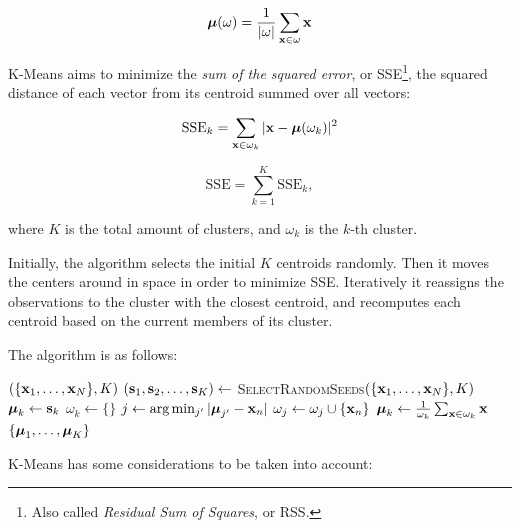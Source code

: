 $$\boldsymbol{\mathbf{\mu}}(\omega) = \frac{1}{|\omega|} \sum_{\boldsymbol{\mathbf{x}} \in \omega} \boldsymbol{\mathbf{x}}$$

K-Means aims to minimize the {\em sum of the squared error}, or
SSE\footnote{Also called {\em Residual Sum of Squares}, or RSS.}, the squared
distance of each vector from its centroid summed over all vectors:

$$ \text{SSE}_k = \sum_{\boldsymbol{\mathbf{x}} \in \omega_k} |\boldsymbol{\mathbf{x}} - \boldsymbol{\mathbf{\mu}}(\omega_k)|^2 $$

$$ \text{SSE} = \sum_{k = 1}^K \text{SSE}_k, $$

where $K$ is the total amount of clusters, and $\omega_k$ is the $k$-th cluster.

Initially, the algorithm selects the initial $K$ centroids randomly.
%
Then it moves the centers around in space in order to minimize SSE.
%
Iteratively it reassigns the observations to the cluster with the closest
centroid, and recomputes each centroid based on the current members of its
cluster. 

The algorithm is as follows: \vspace{.3cm}

\begin{algorithmic}
$(\{\boldsymbol{\mathbf{x}}_1, \ldots, \boldsymbol{\mathbf{x}}_N\}, K)$
    \STATE $(\boldsymbol{\mathbf{s}}_1, \boldsymbol{\mathbf{s}}_2, \ldots, \boldsymbol{\mathbf{s}}_K) \gets$ {\scshape SelectRandomSeeds}$(\{\boldsymbol{\mathbf{x}}_1, \ldots, \boldsymbol{\mathbf{x}}_N\}, K)$
     \STATE $\boldsymbol{\mathbf{\mu}}_k \gets \boldsymbol{\mathbf{s}}_k$ \ENDFOR
            \STATE $\omega_k \gets \{\}$
        \ENDFOR
            \STATE $j \gets \text{arg} \min_{j'} |\boldsymbol{\mathbf{\mu}}_{j'} - \boldsymbol{\mathbf{x}}_n|$
            \STATE $\omega_j \gets \omega_j \cup \{\boldsymbol{\mathbf{x}}_n\}$
        \ENDFOR
            \STATE $\boldsymbol{\mathbf{\mu}}_k \gets \frac{1}{\omega_k}\sum_{\boldsymbol{\mathbf{x}}\in\omega_k}\boldsymbol{\mathbf{x}}$
        \ENDFOR
    \ENDWHILE
    \RETURN $\{\boldsymbol{\mathbf{\mu}}_1, \ldots, \boldsymbol{\mathbf{\mu}}_K\}$
\end{algorithmic}

K-Means has some considerations to be taken into account:

